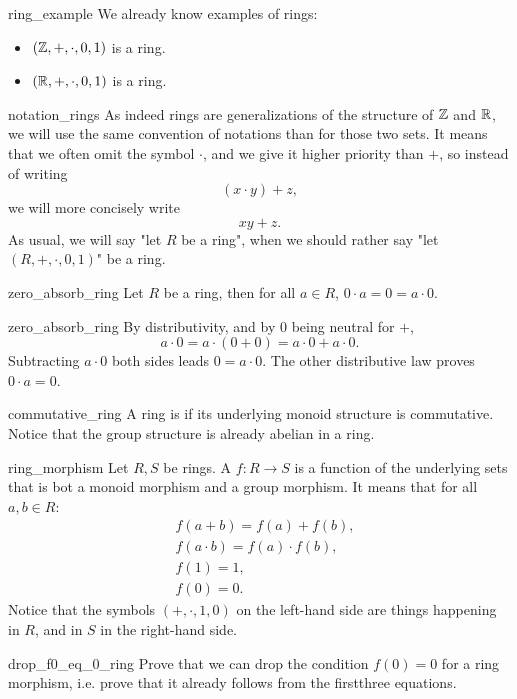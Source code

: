 \begin{cexp}{}{ring_example}
    We already know examples of rings:
    \begin{itemize}
        \item \( (\mathbb{Z}, +, \cdot, 0, 1) \) is a ring.
        \item \( (\mathbb{R}, +, \cdot, 0, 1) \) is a ring.
    \end{itemize}
\end{cexp}

\begin{crem}{}{notation_rings}
    As indeed rings are generalizations of the structure of \( \mathbb{Z} \) and \( \mathbb{R} \), we will use the same convention of notations than for those two sets. It means that we often omit the symbol \( \cdot \), and we give it higher priority than \( + \), so instead of writing
    \begin{equation*}
        (x\cdot y) + z,
    \end{equation*}
    we will more concisely write
    \begin{equation*}
        xy + z.
    \end{equation*}
    As usual, we will say "let \( R \) be a ring", when we should rather say "let \( (R, +, \cdot, 0, 1) \)" be a ring. 
\end{crem}

\begin{clem}{}{zero_absorb_ring}
    Let \( R \) be a ring, then for all \( a \in R \), \( 0\cdot a = 0 = a \cdot 0 \).
\end{clem}
\begin{lemproof}{zero_absorb_ring}
    By distributivity, and by \( 0 \) being neutral for \( + \),
    \begin{equation*}
        a \cdot 0 = a \cdot (0 + 0) = a\cdot 0 + a \cdot 0.        
    \end{equation*}
    Subtracting \( a\cdot 0 \) both sides leads \( 0 = a \cdot 0 \). The other distributive law proves \( 0\cdot a = 0 \).
\end{lemproof}

\begin{cdef}{}{commutative_ring}
    A ring is  if its underlying monoid structure is commutative. Notice that the group structure is already abelian in a ring.
\end{cdef}

\begin{cdef}{}{ring_morphism}
    Let \( R, S \) be rings. A  \( f : R \to S \) is a function of the underlying sets that is bot a monoid morphism and a group morphism. It means that for all \( a, b \in R \):
    \begin{align*}
        &f(a + b) = f(a) + f(b), \\
        &f(a\cdot b) = f(a)\cdot f(b), \\
        &f(1) = 1, \\
        &f(0) = 0.  
    \end{align*}
    Notice that the symbols \( (+, \cdot, 1, 0) \) on the left-hand side are things happening in \( R \), and in \( S \) in the right-hand side.
\end{cdef}

\begin{cex}{}{drop_f0_eq_0_ring}
    Prove that we can drop the condition \( f(0) = 0 \) for a ring morphism, i.e. prove that it already follows from the firstthree equations.
\end{cex}